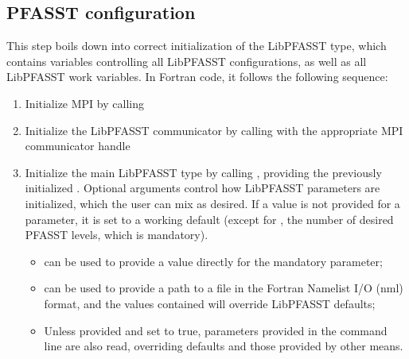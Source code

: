 \subsection{PFASST configuration} \label{sec:impl_pfasst_config}

This step boils down into correct initialization of the LibPFASST  type, which contains variables controlling all LibPFASST configurations, as well as all LibPFASST work variables. In Fortran code, it follows the following sequence:

\begin{enumerate}
    \item \label{config_step_mpi} Initialize MPI by calling  \label{config_step_init}
    \item \label{config_step_comm} Initialize the LibPFASST communicator  by calling  with the appropriate MPI communicator handle
    \item \label{config_step_prm} Initialize the main LibPFASST type  by calling , providing the previously initialized . Optional arguments control how LibPFASST parameters are initialized, which the user can mix as desired. If a value is not provided for a parameter, it is set to a working default (except for , the number of desired PFASST levels, which is mandatory).
    \begin{itemize}
        \item {} can be used to provide a value directly for the mandatory parameter;
        \item {} can be used to provide a path to a file in the Fortran Namelist I/O (nml) format, and the values contained will override LibPFASST defaults;
        \item Unless  provided and set to true, parameters provided in the command line are also read, overriding defaults and those provided by other means.
    \end{itemize}   
\end{enumerate}

